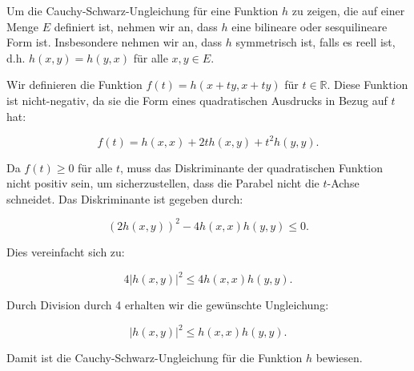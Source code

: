 Um die Cauchy-Schwarz-Ungleichung für eine Funktion \( h \) zu zeigen, die auf einer Menge \( E \) definiert ist, nehmen wir an, dass \( h \) eine bilineare oder sesquilineare Form ist. Insbesondere nehmen wir an, dass \( h \) symmetrisch ist, falls es reell ist, d.h. \( h(x, y) = h(y, x) \) für alle \( x, y \in E \).

Wir definieren die Funktion \( f(t) = h(x + ty, x + ty) \) für \( t \in \mathbb{R} \). Diese Funktion ist nicht-negativ, da sie die Form eines quadratischen Ausdrucks in Bezug auf \( t \) hat:

\[
f(t) = h(x, x) + 2t h(x, y) + t^2 h(y, y).
\]

Da \( f(t) \geq 0 \) für alle \( t \), muss das Diskriminante der quadratischen Funktion nicht positiv sein, um sicherzustellen, dass die Parabel nicht die \( t \)-Achse schneidet. Das Diskriminante ist gegeben durch:

\[
(2h(x, y))^2 - 4h(x, x)h(y, y) \leq 0.
\]

Dies vereinfacht sich zu:

\[
4|h(x, y)|^2 \leq 4h(x, x)h(y, y).
\]

Durch Division durch 4 erhalten wir die gewünschte Ungleichung:

\[
|h(x, y)|^2 \leq h(x, x)h(y, y).
\]

Damit ist die Cauchy-Schwarz-Ungleichung für die Funktion \( h \) bewiesen.

